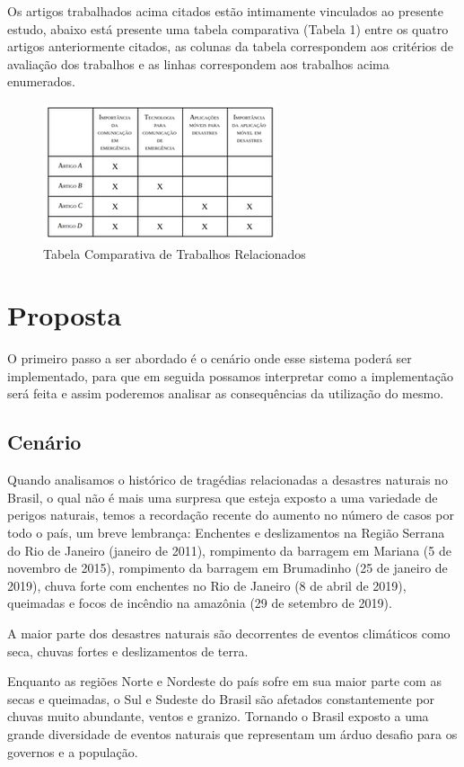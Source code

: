 \documentclass[conference]{IEEEtran}
\begin{document}
Os artigos trabalhados acima citados estão intimamente vinculados ao presente estudo, abaixo está presente uma 
tabela comparativa (Tabela 1) entre os quatro artigos anteriormente citados, as colunas da tabela correspondem 
aos critérios de avaliação dos trabalhos e as linhas correspondem aos trabalhos acima enumerados.

\begin{figure}[htbp]
\centerline{\includegraphics{tabela1.png}}
\caption{Tabela Comparativa de Trabalhos Relacionados}
\label{fig}
\end{figure}

\section{Proposta}

O primeiro passo a ser abordado é o cenário onde esse sistema poderá ser implementado, para que em seguida possamos interpretar como a implementação será feita e  assim poderemos analisar as consequências da utilização do mesmo.

\subsection{Cenário}\label{AA}
Quando analisamos o histórico de tragédias relacionadas a desastres naturais no Brasil, o qual não é mais uma surpresa que esteja exposto a uma variedade de perigos naturais, temos a recordação recente do aumento no número de casos por todo o país, um breve lembrança: Enchentes e deslizamentos na Região Serrana do Rio de Janeiro (janeiro de 2011), rompimento da barragem em Mariana (5 de novembro de 2015), rompimento da barragem em Brumadinho (25 de janeiro de 2019), chuva forte com enchentes no Rio de Janeiro  (8 de abril de 2019), queimadas e focos de incêndio na amazônia (29 de setembro de 2019).

A maior parte dos desastres naturais são decorrentes de eventos climáticos como seca, chuvas fortes e deslizamentos de terra. 

Enquanto as regiões Norte e Nordeste do país sofre em sua maior parte com as secas e queimadas, o Sul  e Sudeste do Brasil são afetados constantemente por chuvas muito abundante, ventos e granizo. Tornando o Brasil exposto a uma grande diversidade de eventos naturais que representam um árduo desafio para os governos e a população.
\end{document}
